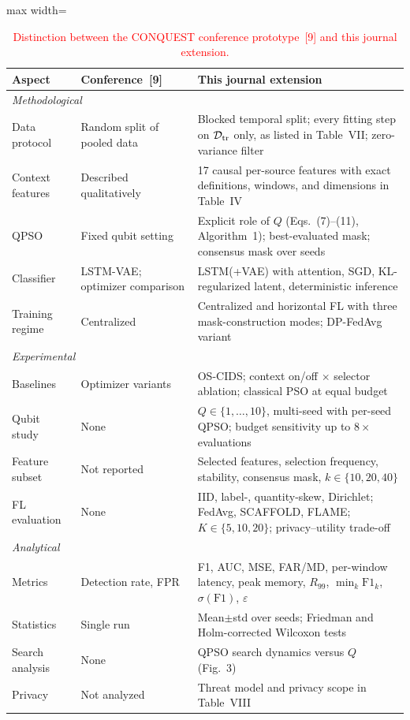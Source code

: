 \documentclass[11pt]{article}
\begin{document}
\begin{table}[H]
\centering
\scriptsize
\caption{\textcolor{red}{Distinction between the CONQUEST conference prototype~{[9]} and this journal extension.}}

\setlength{\tabcolsep}{3pt}
\renewcommand{\arraystretch}{1.10}
\color{red}
\begin{adjustbox}{max width=\linewidth}
\begin{tabular}{p{1.5cm} p{2.4cm} p{3.9cm}}
\hline\toprule
\textbf{Aspect} & \textbf{Conference~{[9]}} & \textbf{This journal extension} \\
\hline\toprule
\multicolumn{3}{l}{\textit{Methodological}} \\
Data protocol & Random split of pooled data & Blocked temporal split; every fitting step on $\mathcal{D}_{\rm tr}$ only, as listed in Table~VII; zero-variance filter \\
Context features & Described qualitatively & 17 causal per-source features with exact definitions, windows, and dimensions in Table~IV \\
QPSO & Fixed qubit setting & Explicit role of $Q$ (Eqs.~(7)--(11), Algorithm~1); best-evaluated mask; consensus mask over seeds \\
Classifier & LSTM-VAE; optimizer comparison & LSTM(+VAE) with attention, SGD, KL-regularized latent, deterministic inference \\
Training regime & Centralized & Centralized and horizontal FL with three mask-construction modes; DP-FedAvg variant \\
\midrule
\multicolumn{3}{l}{\textit{Experimental}} \\
Baselines & Optimizer variants & OS-CIDS; context on/off $\times$ selector ablation; classical PSO at equal budget \\
Qubit study & None & $Q\in\{1,\dots,10\}$, multi-seed with per-seed QPSO; budget sensitivity up to $8\times$ evaluations \\
Feature subset & Not reported & Selected features, selection frequency, stability, consensus mask, $k\in\{10,20,40\}$ \\
FL evaluation & None & IID, label-, quantity-skew, Dirichlet; FedAvg, SCAFFOLD, FLAME; $K\in\{5,10,20\}$; privacy--utility trade-off \\
\midrule
\multicolumn{3}{l}{\textit{Analytical}} \\
Metrics & Detection rate, FPR & F1, AUC, MSE, FAR/MD, per-window latency, peak memory, $R_{99}$, $\min_k\mathrm{F1}_k$, $\sigma(\mathrm{F1})$, $\varepsilon$ \\
Statistics & Single run & Mean$\pm$std over seeds; Friedman and Holm-corrected Wilcoxon tests \\
Search analysis & None & QPSO search dynamics versus $Q$ (Fig.~3) \\
Privacy & Not analyzed & Threat model and privacy scope in Table~VIII \\
\hline\toprule
\end{tabular}
\end{adjustbox}
\end{table}
\end{document}
